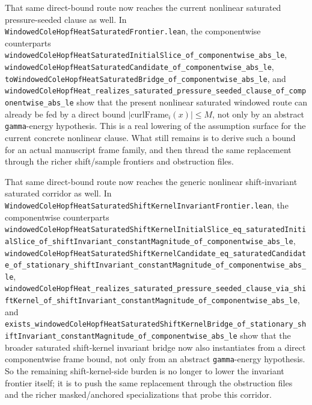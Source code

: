 \documentclass[11pt]{article}
\theoremstyle{remark}
\begin{document}
That same direct-bound route now reaches the current nonlinear saturated
pressure-seeded clause as well.  In
\texttt{WindowedColeHopfHeatSaturatedFrontier.lean}, the componentwise
counterparts
\texttt{windowedColeHopfHeatSaturatedInitialSlice\_of\_componentwise\_abs\_le},
\texttt{windowedColeHopfHeatSaturatedCandidate\_of\_componentwise\_abs\_le},
\texttt{toWindowedColeHopfHeatSaturatedBridge\_of\_componentwise\_abs\_le},
and
\texttt{windowedColeHopfHeat\_realizes\_saturated\_pressure\_seeded\_clause\_of\_componentwise\_abs\_le}
show that the present nonlinear saturated windowed route can already be fed by
a direct bound \(|\mathrm{curlFrame}_i(x)| \le M\), not only by an abstract
\texttt{gamma}-energy hypothesis.  This is a real lowering of the assumption
surface for the current concrete nonlinear clause.  What still remains is to
derive such a bound for an actual manuscript frame family, and then thread the
same replacement through the richer shift/sample frontiers and obstruction
files.

That same direct-bound route now reaches the generic nonlinear
shift-invariant saturated corridor as well.  In
\texttt{WindowedColeHopfHeatSaturatedShiftKernelInvariantFrontier.lean}, the
componentwise counterparts
\texttt{windowedColeHopfHeatSaturatedShiftKernelInitialSlice\_eq\_saturatedInitialSlice\_of\_shiftInvariant\_constantMagnitude\_of\_componentwise\_abs\_le},
\texttt{windowedColeHopfHeatSaturatedShiftKernelCandidate\_eq\_saturatedCandidate\_of\_stationary\_shiftInvariant\_constantMagnitude\_of\_componentwise\_abs\_le},
\texttt{windowedColeHopfHeat\_realizes\_saturated\_pressure\_seeded\_clause\_via\_shiftKernel\_of\_shiftInvariant\_constantMagnitude\_of\_componentwise\_abs\_le},
and
\texttt{exists\_windowedColeHopfHeatSaturatedShiftKernelBridge\_of\_stationary\_shiftInvariant\_constantMagnitude\_of\_componentwise\_abs\_le}
show that the broader saturated shift-kernel invariant bridge now also
instantiates from a direct componentwise frame bound, not only from an
abstract \texttt{gamma}-energy hypothesis.  So the remaining shift-kernel-side
burden is no longer to lower the invariant frontier itself; it is to push the
same replacement through the obstruction files and the richer masked/anchored
specializations that probe this corridor.
\end{document}
